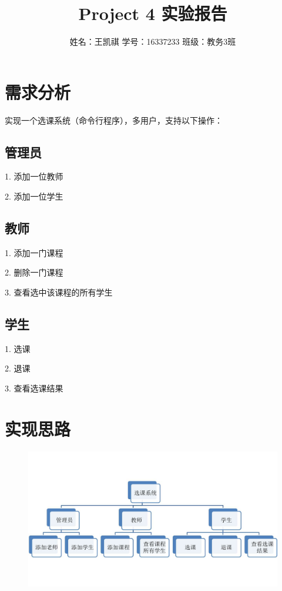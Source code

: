 \documentclass{article}
\begin{document}
\title{Project 4 实验报告}
\author {姓名：王凯祺 \text{ } 学号：16337233 \text{ } 班级：教务3班}
\maketitle

\section{需求分析}
实现一个选课系统（命令行程序），多用户，支持以下操作：

\subsection{管理员}

1. 添加一位教师

2. 添加一位学生

\subsection{教师}

1. 添加一门课程

2. 删除一门课程

3. 查看选中该课程的所有学生

\subsection{学生}

1. 选课

2. 退课

3. 查看选课结果

\section{实现思路}

\begin{figure}[!hbp]
	\centering
	\includegraphics[scale=0.4]{S1.jpg}
\end{figure}
\end{document}
